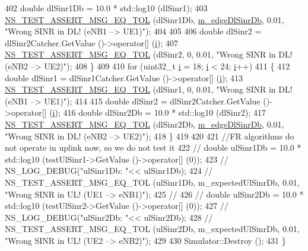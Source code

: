 \begin{DoxyCode}
402       \textcolor{keywordtype}{double} dlSinr1Db = 10.0 * std::log10 (dlSinr1);
403       \hyperlink{group__testing_ga9e7861b56b4e70db3b56044cb7a28e41}{NS\_TEST\_ASSERT\_MSG\_EQ\_TOL} (dlSinr1Db, 
      \hyperlink{classLteInterferenceStrictFrTestCase_a7c49444df9eb531272ca4e8f87bdf2b3}{m\_edgeDlSinrDb}, 0.01, \textcolor{stringliteral}{"Wrong SINR in DL! (eNB1 --> UE1)"});
404 
405 
406       \textcolor{keywordtype}{double} dlSinr2 = dlSinr2Catcher.GetValue ()->operator[] (\hyperlink{bernuolliDistribution_8m_a6f6ccfcf58b31cb6412107d9d5281426}{i});
407       \hyperlink{group__testing_ga9e7861b56b4e70db3b56044cb7a28e41}{NS\_TEST\_ASSERT\_MSG\_EQ\_TOL} (dlSinr2, 0, 0.01, \textcolor{stringliteral}{"Wrong SINR in DL! (eNB2 -->
       UE2)"});
408     \}
409 
410   \textcolor{keywordflow}{for} (uint32\_t \hyperlink{bernuolliDistribution_8m_a6f6ccfcf58b31cb6412107d9d5281426}{i} = 18; \hyperlink{bernuolliDistribution_8m_a6f6ccfcf58b31cb6412107d9d5281426}{i} < 24; \hyperlink{bernuolliDistribution_8m_a6f6ccfcf58b31cb6412107d9d5281426}{i}++)
411     \{
412       \textcolor{keywordtype}{double} dlSinr1 = dlSinr1Catcher.GetValue ()->operator[] (\hyperlink{bernuolliDistribution_8m_a6f6ccfcf58b31cb6412107d9d5281426}{i});
413       \hyperlink{group__testing_ga9e7861b56b4e70db3b56044cb7a28e41}{NS\_TEST\_ASSERT\_MSG\_EQ\_TOL} (dlSinr1, 0, 0.01, \textcolor{stringliteral}{"Wrong SINR in DL! (eNB1 -->
       UE1)"});
414 
415       \textcolor{keywordtype}{double} dlSinr2 = dlSinr2Catcher.GetValue ()->operator[] (\hyperlink{bernuolliDistribution_8m_a6f6ccfcf58b31cb6412107d9d5281426}{i});
416       \textcolor{keywordtype}{double} dlSinr2Db = 10.0 * std::log10 (dlSinr2);
417       \hyperlink{group__testing_ga9e7861b56b4e70db3b56044cb7a28e41}{NS\_TEST\_ASSERT\_MSG\_EQ\_TOL} (dlSinr2Db, 
      \hyperlink{classLteInterferenceStrictFrTestCase_a7c49444df9eb531272ca4e8f87bdf2b3}{m\_edgeDlSinrDb}, 0.01, \textcolor{stringliteral}{"Wrong SINR in DL! (eNB2 --> UE2)"});
418     \}
419 
420 
421   \textcolor{comment}{//FR algorithms do not operate in uplink now, so we do not test it}
422 \textcolor{comment}{//  double ulSinr1Db = 10.0 * std::log10 (testUlSinr1->GetValue ()->operator[] (0));}
423 \textcolor{comment}{//  NS\_LOG\_DEBUG("ulSinr1Db: "<< ulSinr1Db);}
424 \textcolor{comment}{//  NS\_TEST\_ASSERT\_MSG\_EQ\_TOL (ulSinr1Db, m\_expectedUlSinrDb, 0.01, "Wrong SINR in UL!  (UE1 --> eNB1)");}
425 \textcolor{comment}{//}
426 \textcolor{comment}{//  double ulSinr2Db = 10.0 * std::log10 (testUlSinr2->GetValue ()->operator[] (0));}
427 \textcolor{comment}{//  NS\_LOG\_DEBUG("ulSinr2Db: "<< ulSinr2Db);}
428 \textcolor{comment}{//  NS\_TEST\_ASSERT\_MSG\_EQ\_TOL (ulSinr2Db, m\_expectedUlSinrDb, 0.01, "Wrong SINR in UL!  (UE2 --> eNB2)");}
429 
430   Simulator::Destroy ();
431 \}
\end{DoxyCode}


